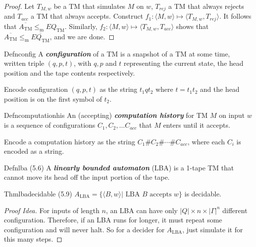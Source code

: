 \begin{proof}
  Let $T_{M,w}$ be a TM that simulates $M$ on $w$, $T_{rej}$ a TM that always rejects and $T_{acc}$ a TM that always accepts. Construct $f_1:\langle M,w\rangle\mapsto\langle T_{M,w},T_{rej}\rangle$. It follows that $\overline{A_{\mathrm{TM}}}\leq_{\mathrm{m}} EQ_{\mathrm{TM}}$. Similarly, $f_2:\langle M,w\rangle\mapsto\langle T_{M,w},T_{acc}\rangle$ shows that $\overline{A_{\mathrm{TM}}}\leq_{\mathrm{m}} \overline{EQ_{\mathrm{TM}}}$, and we are done.
\end{proof}

\begin{reference}{Defn}{config}
  A \textbf{\textit{configuration}} of a TM is a snapshot of a TM at some time, written triple $(q,p,t)$, with $q,p$ and $t$ representing the current state, the head position and the tape contents respectively.
\end{reference}

Encode configuration $(q,p,t)$ as the string $t_1qt_2$ where $t = t_1t_2$ and the head position is on the first symbol of $t_2$.

\begin{reference}{Defn}{computationhis}
  An (accepting) \textbf{\textit{computation history}} for TM $M$ on input $w$ is a sequence of configurations $C_1,C_2,\dots C_{acc}$ that $M$ enters until it accepts.
\end{reference}

Encode a computation history as the string $C_1\# C_2\# \cdots\# C_{acc}$, where each $C_i$ is encoded as a string.

\begin{reference}{Defn}{lba}
  (5.6) A \textbf{\textit{linearly bounded automaton}} (LBA) is a 1-tape TM that cannot move its head off the input portion of the tape.
\end{reference}

\begin{reference}{Thm}{lbadecidable}
  (5.9) $A_{\mathrm{LBA}}=\{\langle B,w\rangle|\text{ LBA }B\text{ accepts }w\}$ is decidable.
\end{reference}

\begin{proof}[Proof Idea]
  For inputs of length $n$, an LBA can have only $|Q|\times n\times|\Gamma|^n$ different configuration. Therefore, if an LBA runs for longer, it must repeat some configuration and will never halt. So for a decider for $A_{\mathrm{LBA}}$, just simulate it for this many steps.
\end{proof}

